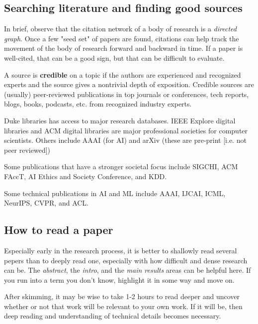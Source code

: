 \documentclass[titlepage, 12pt, leqno]{article}
\begin{document}
\subsection{Searching literature and finding good sources}
In brief, observe that the citation network of a body of research is a 
\textit{directed graph}. Once a few "seed set" of papers are found, citations can
help track the movement of the body of research forward and backward in time. If a
paper is well-cited, that can be a good sign, but that can be difficult to 
evaluate.

A source is \textbf{credible} on a topic if the authors are experienced and
recognized experts and the source gives a nontrivial depth of exposition. Credible
sources are (usually) peer-reviewed publications in top journals or conferences,
tech reports, blogs, books, podcasts, etc. from recognized industry experts.

\begin{note}
    Duke libraries has access to major research databases. IEEE Explore digital
    libraries and ACM digital libraries are major professional societies for
    computer scientists. Others include AAAI (for AI) and arXiv (these are
    pre-print [i.e. not peer reviewed])

    Some publications that have a stronger societal focus include SIGCHI, 
    ACM FAccT, AI Ethics and Society Conference, and KDD.

    Some technical publications in AI and ML include AAAI, IJCAI, ICML, NeurIPS,
    CVPR, and ACL.
\end{note}

\subsection{How to read a paper}
Especially early in the research process, it is better to shallowly read several
pepers than to deeply read one, especially with how difficult and dense research
can be. The \textit{abstract}, the \textit{intro}, and the \textit{main results}
areas can be helpful here. If you run into a term you don't know, highlight it in
some way and move on.

After skimming, it may be wise to take 1-2 hours to read deeper and uncover
whether or not that work will be relevant to your own work. If it will be, then
deep reading and understanding of technical details becomes necessary.
\end{document}
